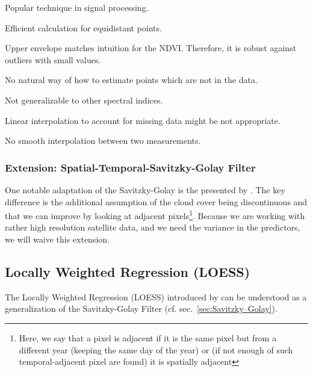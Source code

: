 		\begin{my_pros_cons_table}{
				\item Popular technique in signal processing.
				\item Efficient calculation for equidistant points.
				\item Upper envelope matches intuition for the NDVI. Therefore, it is robust against outliers with small values.
			}{
				\item No natural way of how to estimate points which are not in the data.
				\item Not generalizable to other spectral indices.
				\item Linear interpolation to account for missing data might be not appropriate.
				\item No smooth interpolation between two measurements.
			}
		\end{my_pros_cons_table}


		\subsubsection*{Extension: Spatial-Temporal-Savitzky-Golay Filter}
			One notable adaptation of the Savitzky-Golay is the presented by \cite{caoSimpleMethodImprove2018b}. The key difference is the additional assumption of the cloud cover being discontinuous and that we can improve by looking at adjacent pixels\footnote{Here, we say that a pixel is adjacent if it is the same pixel but from a different year (keeping the same day of the year) or (if not enough of such temporal-adjacent pixel are found) it is spatially adjacent}. Because we are working with rather high resolution satellite data, and we need the variance in the predictors, we will waive this extension.


	\subsection{Locally Weighted Regression (LOESS)}
		\label{sec:loess}

		The Locally Weighted Regression (LOESS) introduced by \cite{clevelandRobustLocallyWeighted1979} can be understood as a generalization of the Savitzky-Golay Filter (cf. sec.~\ref{sec:Savitzky–Golay}).

